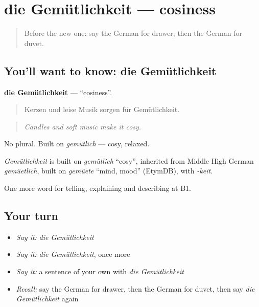 \section[die Gemütlichkeit]{die Gemütlichkeit — cosiness}

\label{lesson:GE-C533-gemuetlichkeit}



\begin{quote}
Before the new one: say the German for drawer, then the German for duvet.
\end{quote}

\subsection*{You'll want to know: die Gemütlichkeit}
\textbf{die Gemütlichkeit} — \textquotedblleft{}cosiness\textquotedblright{}.

\begin{quote}
Kerzen und leise Musik sorgen für Gemütlichkeit.
\end{quote}

\begin{quote}
\emph{Candles and soft music make it cosy.}
\end{quote}

No plural. Built on \emph{gemütlich} — cosy, relaxed.

\begin{cousinweb}
\emph{Gemütlichkeit} is built on \emph{gemütlich} \textquotedblleft{}cosy\textquotedblright{}, inherited from Middle High German \emph{gemüetlich}, built on \emph{gemüete} \textquotedblleft{}mind, mood\textquotedblright{} (EtymDB), with \emph{-keit}.
\end{cousinweb}

\begin{grammarlens}[title={What you've built}]
One more word for telling, explaining and describing at B1.
\end{grammarlens}

\subsection*{Your turn}
\begin{itemize}
\raggedright
  \item \emph{Say it:} \emph{die Gemütlichkeit}
  \item \emph{Say it:} \emph{die Gemütlichkeit}, once more
  \item \emph{Say it:} a sentence of your own with \emph{die Gemütlichkeit}
  \item \emph{Recall:} say the German for drawer, then the German for duvet, then say \emph{die Gemütlichkeit} again
\end{itemize}

